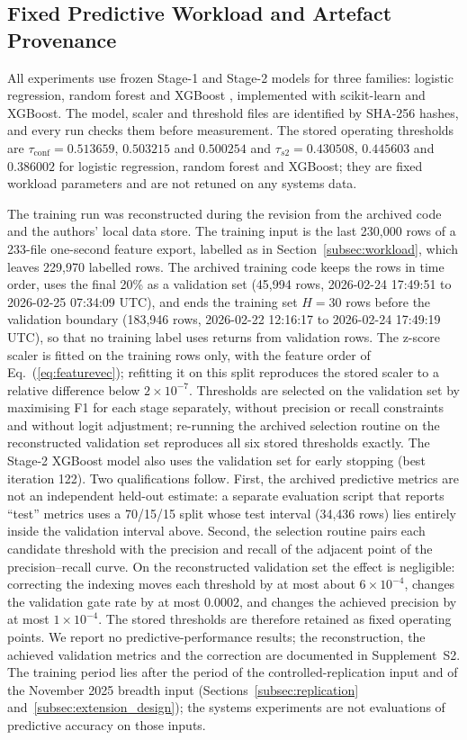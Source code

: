 \documentclass[a4paper,fleqn]{cas-dc}
\begin{document}
\subsection{Fixed Predictive Workload and Artefact Provenance}
\label{subsec:artefacts}
All experiments use frozen Stage-1 and Stage-2 models for three families: logistic regression, random forest \citep{breiman2001rf} and XGBoost \citep{chen2016xgboost}, implemented with scikit-learn \citep{pedregosa2011sklearn} and XGBoost. The model, scaler and threshold files are identified by SHA-256 hashes, and every run checks them before measurement. The stored operating thresholds are $\tau_{\mathrm{conf}}=0.513659$, $0.503215$ and $0.500254$ and $\tau_{s2}=0.430508$, $0.445603$ and $0.386002$ for logistic regression, random forest and XGBoost; they are fixed workload parameters and are not retuned on any systems data.

The training run was reconstructed during the revision from the archived code and the authors' local data store. The training input is the last 230,000 rows of a 233-file one-second feature export, labelled as in Section~\ref{subsec:workload}, which leaves 229,970 labelled rows. The archived training code keeps the rows in time order, uses the final 20\% as a validation set (45,994 rows, 2026-02-24 17:49:51 to 2026-02-25 07:34:09 UTC), and ends the training set $H=30$ rows before the validation boundary (183,946 rows, 2026-02-22 12:16:17 to 2026-02-24 17:49:19 UTC), so that no training label uses returns from validation rows. The z-score scaler is fitted on the training rows only, with the feature order of Eq.~(\ref{eq:featurevec}); refitting it on this split reproduces the stored scaler to a relative difference below $2\times10^{-7}$. Thresholds are selected on the validation set by maximising F1 for each stage separately, without precision or recall constraints and without logit adjustment; re-running the archived selection routine on the reconstructed validation set reproduces all six stored thresholds exactly. The Stage-2 XGBoost model also uses the validation set for early stopping (best iteration 122). Two qualifications follow. First, the archived predictive metrics are not an independent held-out estimate: a separate evaluation script that reports ``test'' metrics uses a 70/15/15 split whose test interval (34,436 rows) lies entirely inside the validation interval above. Second, the selection routine pairs each candidate threshold with the precision and recall of the adjacent point of the precision--recall curve. On the reconstructed validation set the effect is negligible: correcting the indexing moves each threshold by at most about $6\times10^{-4}$, changes the validation gate rate by at most 0.0002, and changes the achieved precision by at most $1\times10^{-4}$. The stored thresholds are therefore retained as fixed operating points. We report no predictive-performance results; the reconstruction, the achieved validation metrics and the correction are documented in Supplement~S2. The training period lies after the period of the controlled-replication input and of the November 2025 breadth input (Sections~\ref{subsec:replication} and~\ref{subsec:extension_design}); the systems experiments are not evaluations of predictive accuracy on those inputs.
\end{document}
